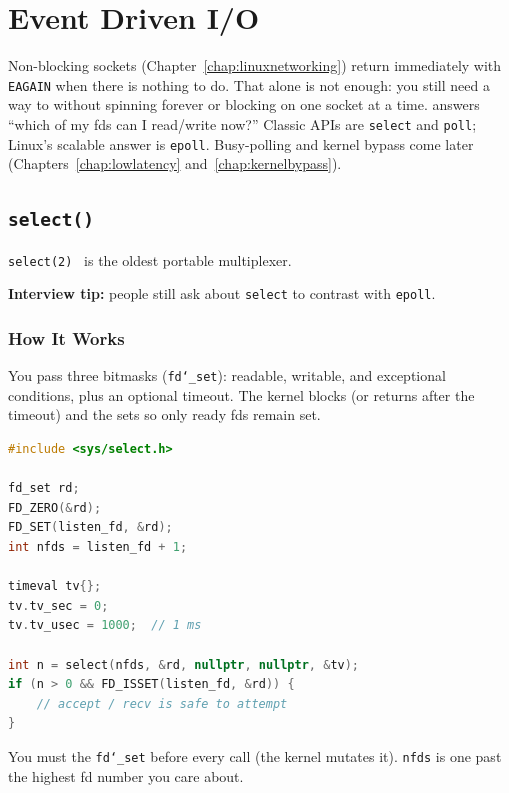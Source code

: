 \chapter{Event Driven I/O}
\label{chap:eventdrivenio}

Non-blocking sockets (Chapter~\ref{chap:linuxnetworking}) return immediately with 
\texttt{EAGAIN} when there is nothing to do. That alone is not enough: you still need a way to 
 without spinning forever or blocking on one socket at a time.
\newline
{} answers ``which of my fds can I read/write now?'' Classic APIs are 
\texttt{select} and \texttt{poll}; Linux's scalable answer is \texttt{epoll}. Busy-polling and 
kernel bypass come later (Chapters~\ref{chap:lowlatency} and~\ref{chap:kernelbypass}).

\section{\texttt{select()}}
\label{sec:select}
\texttt{select(2)}~\cite{man-select} is the oldest portable multiplexer.
\par\noindent\textbf{Interview tip:} people still ask about \texttt{select} to contrast with \texttt{epoll}.

\subsection{How It Works}
\label{subsec:select-how-it-works}
You pass three bitmasks (\texttt{fd\char`_set}): readable, writable, and exceptional conditions, 
plus an optional timeout. The kernel blocks (or returns after the timeout) and  
the sets so only ready fds remain set.
\begin{lstlisting}[language=C++]
#include <sys/select.h>

fd_set rd;
FD_ZERO(&rd);
FD_SET(listen_fd, &rd);
int nfds = listen_fd + 1;

timeval tv{};
tv.tv_sec = 0;
tv.tv_usec = 1000;  // 1 ms

int n = select(nfds, &rd, nullptr, nullptr, &tv);
if (n > 0 && FD_ISSET(listen_fd, &rd)) {
    // accept / recv is safe to attempt
}
\end{lstlisting}
You must  the \texttt{fd\char`_set} before every call (the kernel mutates it). 
\texttt{nfds} is one past the highest fd number you care about.

